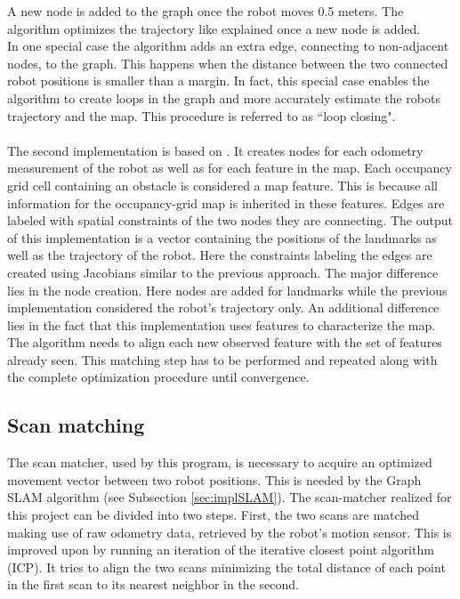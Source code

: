 \documentclass{ba-kecs}
\begin{document}
A new node is added to the graph once the robot moves 0.5 meters. The algorithm optimizes the trajectory like explained once a new node is added.\\
In one special case the algorithm adds an extra edge, connecting to non-adjacent nodes, to the graph. This happens when the distance between the two connected robot positions is smaller than a margin. In fact, this special case enables the algorithm to create loops in the graph and more accurately estimate the robots trajectory and the map. This procedure is referred to as ``loop closing". 
\\
\\
The second implementation is based on \cite{Thrun}. It creates nodes for each odometry measurement of the robot as well as for each feature in the map. Each occupancy grid cell containing an obstacle is considered a map feature. This is because all information for the occupancy-grid map is inherited in these features. Edges are labeled with spatial constraints of the two nodes they are connecting. The output of this implementation is a vector containing the positions of the landmarks as well as the trajectory of the robot. Here the constraints labeling the edges are created using Jacobians similar to the previous approach. The major difference lies in the node creation. Here nodes are added for landmarks while the previous implementation considered the robot's trajectory only. An additional difference lies in the fact that this implementation uses features to characterize the map. The algorithm needs to align each new observed feature with the set of features already seen. This matching step has to be performed and repeated along with the complete optimization procedure until convergence.

\subsection{Scan matching}
\label{sec:scan}
The scan matcher, used by this program, is necessary to acquire an optimized movement vector between two robot positions. This is needed by the Graph SLAM algorithm (see Subsection \ref{sec:implSLAM}). The scan-matcher realized for this project can be divided into two steps. First, the two scans are matched making use of raw odometry data, retrieved by the robot's motion sensor. This is improved upon by running an iteration of the iterative closest point algorithm (ICP). It tries to align the two scans minimizing the total distance of each point in the first scan to its nearest neighbor in the second. 
\end{document}
